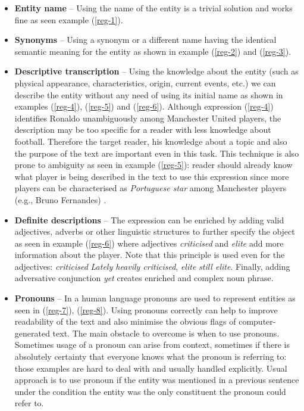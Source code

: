 \begin{itemize}
	\item \textbf{Entity name} -- Using the name of the entity is a trivial solution and works fine as seen example (\ref{reg-1}).
	\item \textbf{Synonyms} -- Using a synonym or a different name having the identical semantic meaning for the entity as shown in example (\ref{reg-2}) and (\ref{reg-3}). 
	\item \textbf{Descriptive transcription} -- Using the knowledge about the entity (such as physical appearance, characteristics, origin, current events, etc.) we can describe the entity without any need of using its initial name as shown in examples (\ref{reg-4}), (\ref{reg-5}) and (\ref{reg-6}). Although expression (\ref{reg-4}) identifies Ronaldo unambiguously among Manchester United players, the description  may be too specific for a reader with less knowledge about football. Therefore the target reader, his knowledge about a topic and also the purpose of the text are important even in this task. This technique is also prone to ambiguity as seen in example (\ref{reg-5}): reader should already know what player is being described in the text to use this expression since more players can be characterised as \textit{Portuguese star} among Manchester players (e.g., Bruno Fernandes) .
	\item \textbf{Definite descriptions} -- The expression can be enriched by adding valid adjectives, adverbs or other linguistic structures to further specify the object as seen in example (\ref{reg-6}) where adjectives \textit{criticised} and \textit{elite} add more information about the player. Note that this principle is used even for the adjectives: \textit{criticised} \textrightarrow \textit{Lately heavily criticised}, \textit{elite} \textrightarrow \textit{still elite}. Finally, adding adversative conjunction \textit{yet} creates enriched and complex noun phrase.
	\item \textbf{Pronouns} -- In a human language pronouns are used to represent entities as seen in (\ref{reg-7}), (\ref{reg-8}). Using pronouns correctly can help to improve readability of the text and also minimise the obvious flags of computer-generated text. The main obstacle to overcome is when to use pronouns. Sometimes usage of a pronoun can arise from context, sometimes if there is absolutely certainty that everyone knows what the pronoun is referring to: those examples are hard to deal with and usually handled explicitly. Usual approach is to use pronoun if the entity was mentioned in a previous sentence under the condition the entity was the only constituent the pronoun could refer to.
\end{itemize}

